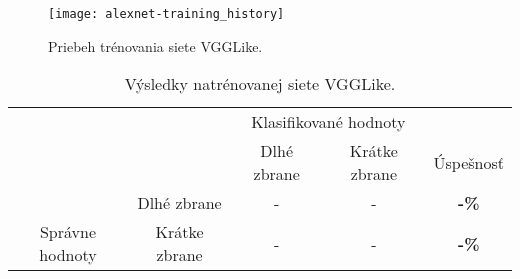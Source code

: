 \begin{figure}[H]
	\centering
	\texttt{[image: alexnet-training\_history]} %
	\caption{Priebeh trénovania siete VGGLike.}
	\label{pic:vgglikehistory}
\end{figure}

\begin{table}[H]
    \centering
    \begin{tabular}{ccccc}
                                                                &                                    & \multicolumn{2}{c}{Klasifikované hodnoty}                                                         &                                    \\ \cline{3-5} 
                                                                & \multicolumn{1}{c|}{}              & \multicolumn{1}{c|}{Dlhé zbrane}                & \multicolumn{1}{c|}{Krátke zbrane}              & \multicolumn{1}{c|}{Úspešnosť}     \\ \cline{2-5} 
        \multicolumn{1}{c|}{}                                  & \multicolumn{1}{c|}{Dlhé zbrane}   & \multicolumn{1}{c|}{{\color[HTML]{009901} -}} & \multicolumn{1}{c|}{{\color[HTML]{9A0000} -}}  & \multicolumn{1}{c|}{\textbf{-\%}} \\ \cline{2-5} 
        \multicolumn{1}{c|}{\multirow{-2}{*}{Správne hodnoty}} & \multicolumn{1}{c|}{Krátke zbrane} & \multicolumn{1}{c|}{{\color[HTML]{9A0000} -}}  & \multicolumn{1}{c|}{{\color[HTML]{009901} -}} & \multicolumn{1}{c|}{\textbf{-\%}} \\ \cline{2-5} 
    \end{tabular}
    \caption{Výsledky natrénovanej siete VGGLike.}
    \label{tab:vgglikeresults}
\end{table}
